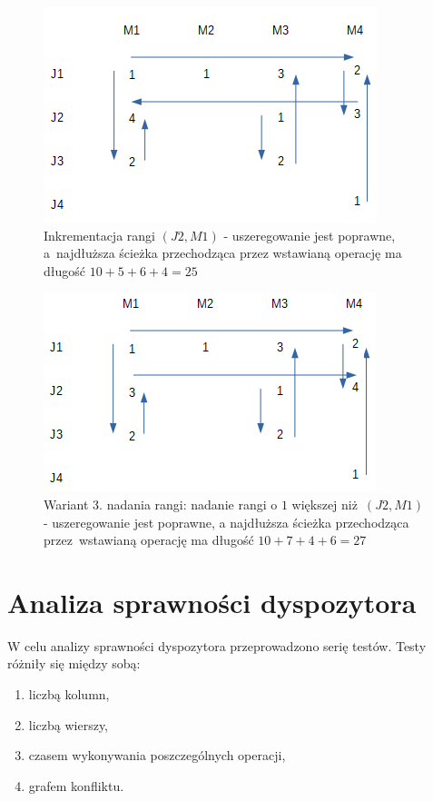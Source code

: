 \documentclass[brudnopis]{xmgr}
\begin{document}
\begin{figure}[!tbh]
\centering
\includegraphics[width=.7\hsize]{fig/3.png}
\caption{Inkrementacja rangi $(J2, M1)$ - uszeregowanie jest poprawne, a~najdłuższa ścieżka przechodząca przez wstawianą operację ma długość $10 + 5 + 6 + 4 = 25$\label{diag:state3}}
\end{figure}\medskip

\begin{figure}[!tbh]
\centering
\includegraphics[width=.7\hsize]{fig/4.png}
\caption{Wariant 3. nadania rangi: nadanie rangi o $1$ większej niż~$(J2, M1)$ - uszeregowanie jest poprawne, a najdłuższa ścieżka przechodząca przez~wstawianą operację ma długość $10 + 7 + 4 + 6 = 27$\label{diag:state4}}
\end{figure}\medskip



\chapter{Analiza sprawności dyspozytora}

W celu analizy sprawności dyspozytora przeprowadzono serię testów.
Testy różniły się między sobą:
\begin{enumerate}
    \item liczbą kolumn,
    \item liczbą wierszy,
    \item czasem wykonywania poszczególnych operacji,
    \item grafem konfliktu.
\end{enumerate}
\end{document}
